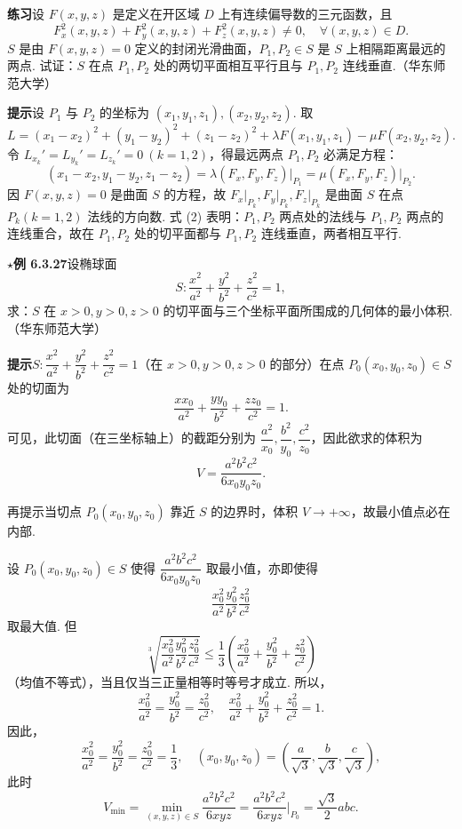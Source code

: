 \documentclass[UTF8, 12pt, fontset=fandol, oneside]{ctexart}
\begin{document}
\noindent\textbf{练习}\quad 设 $F(x,y,z)$ 是定义在开区域 $D$ 上有连续偏导数的三元函数，且
\[
  F_x^2(x,y,z)+F_y^2(x,y,z)+F_z^2(x,y,z)\ne0,\quad
  \forall(x,y,z)\in D. \tag{1}
\]
$S$ 是由 $F(x,y,z)=0$ 定义的封闭光滑曲面，$P_1,P_2\in S$ 是 $S$ 上相隔距离最远的两点. 试证：$S$ 在点 $P_1,P_2$ 处的两切平面相互平行且与 $P_1,P_2$ 连线垂直.（华东师范大学）

\noindent\textbf{提示}\quad 设 $P_1$ 与 $P_2$ 的坐标为 $(x_1,y_1,z_1),(x_2,y_2,z_2)$. 取
\[
  L=(x_1-x_2)^2+(y_1-y_2)^2+(z_1-z_2)^2
  +\lambda F(x_1,y_1,z_1)-\mu F(x_2,y_2,z_2).
\]
令 $L_{x_k}'=L_{y_k}'=L_{z_k}'=0\ (k=1,2)$，得最远两点 $P_1,P_2$ 必满足方程：
\[
  (x_1-x_2,y_1-y_2,z_1-z_2)
  =\lambda(F_x,F_y,F_z)\big|_{P_1}
  =\mu(F_x,F_y,F_z)\big|_{P_2}. \tag{2}
\]
因 $F(x,y,z)=0$ 是曲面 $S$ 的方程，故 $F_x\big|_{P_k},F_y\big|_{P_k},F_z\big|_{P_k}$ 是曲面 $S$ 在点 $P_k(k=1,2)$ 法线的方向数. 式 (2) 表明：$P_1,P_2$ 两点处的法线与 $P_1,P_2$ 两点的连线重合，故在 $P_1,P_2$ 处的切平面都与 $P_1,P_2$ 连线垂直，两者相互平行.

\noindent\textbf{\ensuremath{\star}例 6.3.27}\quad 设椭球面
\[
  S:\frac{x^2}{a^2}+\frac{y^2}{b^2}+\frac{z^2}{c^2}=1,
\]
求：$S$ 在 $x>0,y>0,z>0$ 的切平面与三个坐标平面所围成的几何体的最小体积.（华东师范大学）

\noindent\textbf{提示}\quad $S:\dfrac{x^2}{a^2}+\dfrac{y^2}{b^2}+\dfrac{z^2}{c^2}=1$（在 $x>0,y>0,z>0$ 的部分）在点 $P_0(x_0,y_0,z_0)\in S$ 处的切面为
\[
  \frac{xx_0}{a^2}+\frac{yy_0}{b^2}+\frac{zz_0}{c^2}=1.
\]
可见，此切面（在三坐标轴上）的截距分别为 $\dfrac{a^2}{x_0},\dfrac{b^2}{y_0},\dfrac{c^2}{z_0}$，因此欲求的体积为
\[
  V=\frac{a^2b^2c^2}{6x_0y_0z_0}.
\]

再提示\quad 当切点 $P_0(x_0,y_0,z_0)$ 靠近 $S$ 的边界时，体积 $V\to+\infty$，故最小值点必在内部.

设 $P_0(x_0,y_0,z_0)\in S$ 使得 $\dfrac{a^2b^2c^2}{6x_0y_0z_0}$ 取最小值，亦即使得
\[
  \frac{x_0^2}{a^2}\frac{y_0^2}{b^2}\frac{z_0^2}{c^2}
\]
取最大值. 但
\[
  \sqrt[3]{\frac{x_0^2}{a^2}\frac{y_0^2}{b^2}\frac{z_0^2}{c^2}}
  \le \frac13\left(\frac{x_0^2}{a^2}+\frac{y_0^2}{b^2}+\frac{z_0^2}{c^2}\right)
\]
（均值不等式），当且仅当三正量相等时等号才成立. 所以，
\[
  \frac{x_0^2}{a^2}=\frac{y_0^2}{b^2}=\frac{z_0^2}{c^2},
  \quad
  \frac{x_0^2}{a^2}+\frac{y_0^2}{b^2}+\frac{z_0^2}{c^2}=1.
\]
因此，
\[
  \frac{x_0^2}{a^2}=\frac{y_0^2}{b^2}=\frac{z_0^2}{c^2}=\frac13,
  \quad
  (x_0,y_0,z_0)=\left(\frac{a}{\sqrt3},\frac{b}{\sqrt3},\frac{c}{\sqrt3}\right),
\]
此时
\[
  V_{\min}=\min_{(x,y,z)\in S}\frac{a^2b^2c^2}{6xyz}
  =\frac{a^2b^2c^2}{6xyz}\bigg|_{P_0}
  =\frac{\sqrt3}{2}abc.
\]
\end{document}
